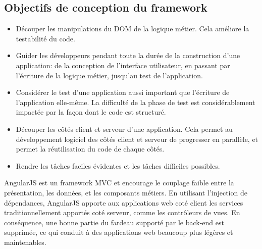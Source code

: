 \subsection{Objectifs de conception du framework}
\begin{itemize}

	\item[\textbullet]
    Découper les manipulations du DOM de la logique métier. Cela améliore la testabilité du code.
    
	\item[\textbullet]
    Guider les développeurs pendant toute la durée de la construction d'une application: de la conception de l'interface utilisateur, en passant par l'écriture de la logique métier, jusqu'au test de l'application.

	\item[\textbullet]
    Considérer le test d'une application aussi important que l'écriture de l'application elle-même. La difficulté de la phase de test est considérablement impactée par la façon dont le code est structuré.

	\item[\textbullet]
    Découper les côtés client et serveur d'une application. Cela permet au développement logiciel des côtés client et serveur de progresser en parallèle, et permet la réutilisation du code de chaque côtés.

	\item[\textbullet]
    Rendre les tâches faciles évidentes et les tâches difficiles possibles.

\end{itemize}

AngularJS est un framework MVC et encourage le couplage faible entre la présentation, les données, et les composants métiers. En utilisant l’injection de dépendances, AngularJS apporte aux applications web coté client les services traditionnellement apportés coté serveur, comme les contrôleurs de vues. En conséquence, une bonne partie du fardeau supporté par le back-end est supprimée, ce qui conduit à des applications web beaucoup plus légères et maintenables.
